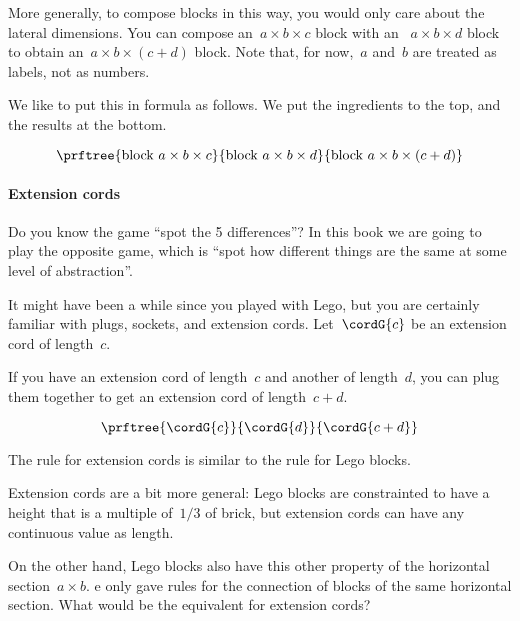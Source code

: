 More generally, to compose blocks in this way, you would only care about the lateral dimensions.
You can compose an~$a \times b \times c$ block with an ~$a \times b \times d$ block to obtain an~$a \times b \times( c + d)$ block.
Note that, for now,~$a$ and~$b$ are treated as labels, not as numbers.

We like to put this in formula as follows. We put the ingredients to the top, and the results at the bottom.

\begin{equation}
  \prftree{\text{block } a \times b \times c}{\text{block } a \times b \times d }{%
    \text{block } a \times b \times (c+d)
  }
\end{equation}

\paragraph{Extension cords}

Do you know the game ``spot the 5 differences''? In this book we are going to play the opposite game, which is ``spot how different things are the same at some level of abstraction''.

It might have been a while since you played with Lego, but you are certainly familiar with plugs, sockets, and extension cords.
Let~$\cordG{c}$ be an extension cord of length~$c$.

If you have an extension cord of length~$c$ and another of length~$d$, you can plug them together to get an extension cord of length~$c+d$.

\begin{equation}\label{eq:cords}
  \prftree{\cordG{c}}{\cordG{d}}{\cordG{c+d}}
\end{equation}

The rule for extension cords is similar to the rule for Lego blocks.
%


Extension cords are a bit more general: Lego blocks are constrainted to have a height that is a multiple of~$1/3$ of brick,  but extension cords can have any continuous value as length.

On the other hand, Lego blocks also have this other property of the horizontal section~$a \times b$.
e only gave rules for the connection of blocks of the same horizontal section.
What would be the equivalent for extension cords?

